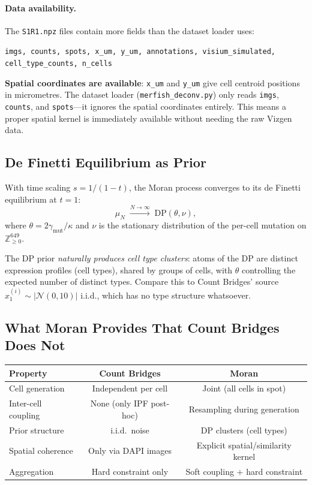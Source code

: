 \documentclass[11pt]{article}
\begin{document}
\paragraph{Data availability.} The \texttt{S1R1.npz} files contain more fields than the dataset loader uses:
\begin{center}
\texttt{imgs, counts, spots, x\_um, y\_um, annotations, visium\_simulated, cell\_type\_counts, n\_cells}
\end{center}
\textbf{Spatial coordinates are available}: \texttt{x\_um} and \texttt{y\_um} give cell centroid positions in micrometres. The dataset loader (\texttt{merfish\_deconv.py}) only reads \texttt{imgs}, \texttt{counts}, and \texttt{spots}---it ignores the spatial coordinates entirely. This means a proper spatial kernel is immediately available without needing the raw Vizgen data.

\subsection{De Finetti Equilibrium as Prior}

With time scaling $s = 1/(1-t)$, the Moran process converges to its de Finetti equilibrium at $t = 1$:
\[
  \mu_N \;\xrightarrow{N \to \infty}\; \text{DP}(\theta, \nu),
\]
where $\theta = 2\gamma_{\text{mut}}/\kappa$ and $\nu$ is the stationary distribution of the per-cell mutation on $\mathbb{Z}_{\geq 0}^{649}$.

The DP prior \emph{naturally produces cell type clusters}: atoms of the DP are distinct expression profiles (cell types), shared by groups of cells, with $\theta$ controlling the expected number of distinct types. Compare this to Count Bridges' source $x_1^{(i)} \sim |\mathcal{N}(0, 10)|$ i.i.d., which has no type structure whatsoever.

\subsection{What Moran Provides That Count Bridges Does Not}

\begin{center}
\begin{tabular}{lcc}
\toprule
Property & Count Bridges & Moran \\
\midrule
Cell generation & Independent per cell & Joint (all cells in spot) \\
Inter-cell coupling & None (only IPF post-hoc) & Resampling during generation \\
Prior structure & i.i.d.\ noise & DP clusters (cell types) \\
Spatial coherence & Only via DAPI images & Explicit spatial/similarity kernel \\
Aggregation & Hard constraint only & Soft coupling $+$ hard constraint \\
\bottomrule
\end{tabular}
\end{center}
\end{document}
